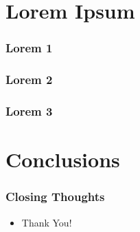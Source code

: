 \documentclass[aspectratio=169]{beamer}
\begin{document}
	\section{Lorem Ipsum}
		\begin{frame}
			\frametitle{Lorem 1}
			\blindtext
		\end{frame}

		\begin{frame}
			\frametitle{Lorem 2}
			\blindtext
		\end{frame}

		\begin{frame}
			\frametitle{Lorem 3}
			\blindtext
		\end{frame}
	
	\section{Conclusions}
		\begin{frame}
			\frametitle{Closing Thoughts}
			\begin{itemize}
				\item Thank You!
			\end{itemize}
		\end{frame}
\end{document}

